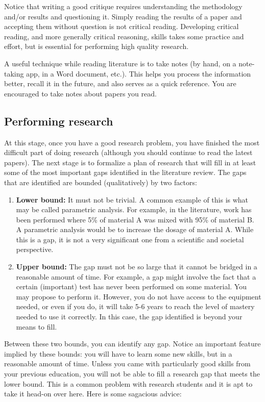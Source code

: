 \documentclass[12pt]{article}
\begin{document}
Notice that writing a good critique requires understanding the methodology and/or results and questioning it. Simply reading the results of a paper and accepting them without question is not critical reading. Developing critical reading, and more generally critical reasoning, skills takes some practice and effort, but is essential for performing high quality research.

A useful technique while reading literature is to take notes (by hand, on a note-taking app, in a Word document, etc.). This helps you process the information better, recall it in the future, and also serves as a quick reference. You are encouraged to take notes about papers you read.

\subsection{Performing research}
At this stage, once you have a good research problem, you have finished the most difficult part of doing research (although you should continue to read the latest papers). The next stage is to formalize a plan of research that will fill in at least some of the most important gaps identified in the literature review. The gaps that are identified are bounded (qualitatively) by two factors:

\begin{enumerate}
	\item \textbf{Lower bound:} It must not be trivial. A common example of this is what may be called parametric analysis. For example, in the literature, work has been performed where 5\% of material A was mixed with 95\% of material B. A parametric analysis would be to increase the dosage of material A. While this is a gap, it is not a very significant one from a scientific and societal perspective. 
	\item \textbf{Upper bound:} The gap must not be so large that it cannot be bridged in a reasonable amount of time. For example, a gap might involve the fact that a certain (important) test has never been performed on some material. You may propose to perform it. However, you do not have access to the equipment needed, or even if you do, it will take 5-6 years to reach the level of mastery needed to use it correctly. In this case, the gap identified is beyond your means to fill.
\end{enumerate}

Between these two bounds, you can identify any gap. Notice an important feature implied by these bounds: you will have to learn some new skills, but in a reasonable amount of time. Unless you came with particularly good skills from your previous education, you will not be able to fill a research gap that meets the lower bound. This is a common problem with research students and it is apt to take it head-on over here. Here is some sagacious advice:
\end{document}
